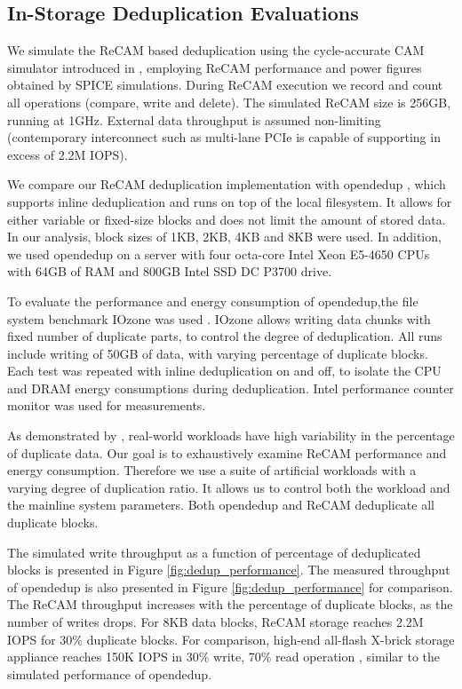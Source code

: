 \documentclass{superfri}
\begin{document}
	
	\subsection{In-Storage Deduplication Evaluations}
	
	We simulate the ReCAM based deduplication using the cycle-accurate CAM simulator introduced in \cite{yavits2015resistive}, employing ReCAM performance and power figures obtained by SPICE simulations. During ReCAM execution we record and count all operations (compare, write and delete).  The simulated ReCAM size is 256GB, running at 1GHz. External data throughput is assumed non-limiting (contemporary interconnect such as multi-lane PCIe is capable of supporting in excess of 2.2M IOPS).
	
	We compare our ReCAM deduplication implementation with opendedup ‎\cite{silverberg2010opendedup}, which supports inline deduplication and runs on top of the local filesystem. It allows for either variable or fixed-size blocks and does not limit the amount of stored data. In our analysis, block sizes of 1KB, 2KB, 4KB and 8KB were used. In addition, we used opendedup on a server with four octa-core Intel Xeon E5-4650 CPUs with 64GB of RAM and 800GB Intel SSD DC P3700 drive.
	
	To evaluate the performance and energy consumption of opendedup,the file system benchmark IOzone was used \cite{norcott2003iozone}. IOzone allows writing data chunks with fixed number of duplicate parts, to control the degree of deduplication. All runs include writing of 50GB of data, with varying percentage of duplicate blocks. Each test was repeated with inline deduplication on and off, to isolate the CPU and DRAM energy consumptions during deduplication. Intel performance counter monitor \cite{intelPCM} was used for measurements. 
	
	As demonstrated by ‎\cite{zhu2008avoiding}, real-world workloads have high variability in the percentage of duplicate data. Our goal is to exhaustively examine ReCAM performance and energy consumption. Therefore we use a suite of artificial workloads with a varying degree of duplication ratio. It allows us to control both the workload and the mainline system parameters. Both opendedup and ReCAM deduplicate all duplicate blocks.
	
	The simulated write throughput as a function of percentage of deduplicated blocks is presented in Figure \ref{fig:dedup_performance}. The measured throughput of opendedup is also presented in Figure \ref{fig:dedup_performance} for comparison. The ReCAM throughput increases with the percentage of duplicate blocks, as the number of writes drops. For 8KB data blocks, ReCAM storage reaches 2.2M IOPS for 30\% duplicate blocks. For comparison, high-end all-flash X-brick storage appliance reaches 150K IOPS in 30\% write, 70\% read operation \cite{XbrickSpec}, similar to the simulated performance of opendedup. 
	
\end{document}
